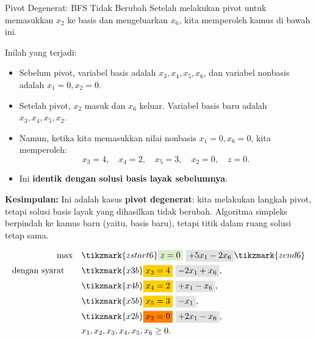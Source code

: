 \begin{remark}{Pivot Degenerat: BFS Tidak Berubah}{}
Setelah melakukan pivot untuk memasukkan \(x_2\) ke basis dan mengeluarkan \(x_6\), kita memperoleh kamus di bawah ini. 

Inilah yang terjadi:

\begin{itemize}
    \item Sebelum pivot, variabel basis adalah \(x_3, x_4, x_5, x_6\), dan variabel nonbasis adalah \(x_1 = 0, x_2 = 0\).
    \item Setelah pivot, \(x_2\) masuk dan \(x_6\) keluar. Variabel basis baru adalah \(x_3, x_4, x_5, x_2\).
    \item Namun, ketika kita memasukkan nilai nonbasis \(x_1 = 0, x_6 = 0\), kita memperoleh:
    \[
    x_3 = 4, \quad x_4 = 2, \quad x_5 = 3, \quad x_2 = 0, \quad z = 0.
    \]
    \item Ini \textbf{identik dengan solusi basis layak sebelumnya}.
\end{itemize}

\textbf{Kesimpulan:}  
Ini adalah kasus \textbf{pivot degenerat}: kita melakukan langkah pivot, tetapi solusi basis layak yang dihasilkan tidak berubah. Algoritma simpleks berpindah ke kamus baru (yaitu, basis baru), tetapi titik dalam ruang solusi tetap sama.

\vspace{1cm}

\[
\begin{aligned}
\max \quad 
& \tikzmark{zstart6} \text{\colorbox{green!20!white}{$z = 0$}} ~ \text{\colorbox{gray!20!white}{$+ 5x_1 - 2x_6$}} \tikzmark{zend6} \\
\st \quad 
& \tikzmark{x3b} \text{\colorbox{yellow}{$x_3 = 4$}} ~ \text{\colorbox{gray!20!white}{$- 2x_1 + x_6$}},\\ 
& \tikzmark{x4b} \text{\colorbox{yellow}{$x_4 = 2$}} ~ \text{\colorbox{gray!20!white}{$+ x_1 - x_6$}},\\ 
& \tikzmark{x5b} \text{\colorbox{yellow}{$x_5 = 3$}} ~ \text{\colorbox{gray!20!white}{$- x_1$}},\\ 
& \tikzmark{x2b} \text{\colorbox{orange}{$x_2 = 0$}} ~ \text{\colorbox{gray!20!white}{$+ 2x_1 - x_6$}},\\
& x_1, x_2, x_3, x_4, x_5, x_6 \ge 0.
\end{aligned}
\]

\begin{tikzpicture}[remember picture, overlay, >=stealth]


\end{tikzpicture}
\end{remark}
